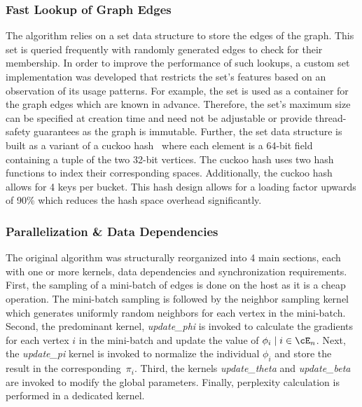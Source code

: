 \subsubsection{Fast Lookup of Graph Edges}

The algorithm relies on a set data structure to store the edges of the graph.
This set is queried frequently with randomly generated edges to check for their
membership. In order to improve the performance of such lookups, a custom set
implementation was developed that restricts the set's features based on an
observation of its usage patterns. For example, the set is used as a container
for the graph edges which are known in advance. Therefore, the set's maximum
size can be specified at creation time and need not be adjustable or provide
thread-safety guarantees as the graph is immutable. Further, the set data
structure is built as a variant of a cuckoo
hash~\cite{Pagh:2004:CH:1006424.1006426} where each element is a 64-bit
field containing a tuple of the two 32-bit vertices. The cuckoo hash
uses two hash functions to index their corresponding spaces. Additionally, the
cuckoo hash allows for 4 keys per bucket. This hash design allows for a loading
factor upwards of 90\% which reduces the hash space overhead
significantly.

\subsubsection{Parallelization \& Data Dependencies}
The original algorithm was structurally reorganized into 4 main sections, each with
one or more kernels, data dependencies and synchronization requirements.
%
First, the sampling of a mini-batch of edges is done on the host as it is a
cheap operation. The mini-batch sampling is followed by the neighbor sampling
kernel which generates uniformly random neighbors for each vertex in the
mini-batch. 
%
Second, the predominant kernel, \textit{update\_phi} is invoked to calculate the
gradients for each vertex $i$ in the mini-batch \Minibatch and update the value of $\phi_i
\mid i \in \Minibatch$. Next, the \textit{update\_pi} kernel is invoked to normalize the
individual $\phi_i$ and store the result in the corresponding~$\pi_i$.
%
Third, the kernels \textit{update\_theta} and \textit{update\_beta} are invoked to modify the
global parameters.
%
Finally, perplexity calculation is performed in a dedicated kernel.

